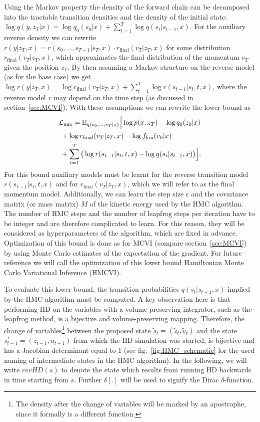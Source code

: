 Using the Markov property the density of the forward chain can be decomposed into the tractable transition densities and the density of the initial state: $\log q(y, z_T|x) = \log q_0(s_0|x) + \sum_{t=1}^T \log q(s_t|s_{t-1}, x)$. For the auxiliary reverse density we can rewrite $r(y | z_T, x) = r(s_0, \ldots, s_{T-1}| s_T, x) \cdot r_{\textrm{final}}(v_T | z_T, x)$ for some distribution $r_{\textrm{final}}(v_T|z_T, x)$, which approximates the final distribution of the momentum $v_T$ given the position $z_T$. By then assuming a Markov structure on the reverse model (as for the base case) we get $\log r(y | z_T, x) = \log r_{\textrm{final}}(v_T | z_T, x) + \sum_{t=1}^T \log r(s_{t-1}|s_t, t, x)$, where the reverse model $r$ may depend on the time step (as discussed in section~\ref{sec:MCVI}). With these assumptions we can rewrite the lower bound as
\begin{equation} \label{eq:HMCVIAuxLowerBound}
\begin{split}
&\mathcal{L_\textrm{aux}} = \mathbb{E}_{q(s_0, \ldots, s_T|x)} \Big[ \log p(x, z_T) - \log q_0(z_0|x) \\
&\;+ \log r_{\textrm{final}}(v_T | z_T, x) - \log f_\textrm{kin}(v_0|x)  \\ 
&\;+ \sum \limits_{t=1}^T \big( \log r(s_{t-1}|s_t, t, x) - \log q(s_t|s_{t-1}, x) \big) \Big].
\end{split}
\end{equation}
For this bound auxiliary models must be learnt for the reverse transition model $r(s_{t-1}|s_t, t, x)$ and for $r_{\textrm{final}}(v_T | z_T, x)$, which we will refer to as the final momentum model. Additionally, we can learn the step size $\epsilon$ and the covariance matrix (or mass matrix) $M$ of the kinetic energy used by the HMC algorithm. The number of HMC steps and the number of leapfrog steps per iteration have to be integer and are therefore complicated to learn. For this reason, they will be considered as hyperparameters of the algorithm, which are fixed in advance. Optimization of this bound is done as for MCVI (compare section~\ref{sec:MCVI}) by using Monte Carlo estimates of the expectation of the gradient. For future reference we will call the optimization of this lower bound Hamiltonian Monte Carlo Variational Inference (HMCVI).

To evaluate this lower bound, the transition probabilities $q(s_t|s_{t-1}, x)$ implied by the HMC algorithm must be computed. A key observation here is that performing HD on the variables with a volume-preserving integrator, such as the leapfrog method, is a bijective and volume-preserving mapping. Therefore, the change of variables\footnote{The density after the change of variables will be marked by an apostrophe, since it formally is a different function.} between the proposed state $\tilde{s}_t = (\tilde{z}_t, \tilde{v}_t)$ and the state $s^*_{t-1} = (z_{t-1}, u_{t-1})$ from which the HD simulation was started, is bijective and has a Jacobian determinant equal to 1 (see fig.~\ref{fig:HMC_schematic} for the used naming of intermediate states in the HMC algorithm). In the following, we will write $revHD(s)$ to denote the state which results from running HD backwards in time starting from $s$. Further $\delta[.]$ will be used to signify the Dirac $\delta$-function.

